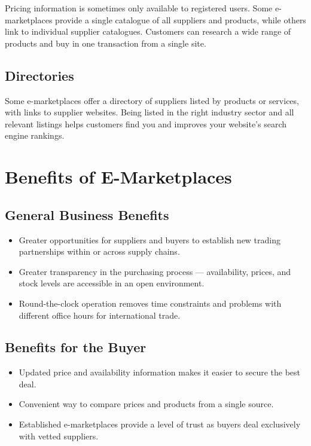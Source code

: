 \documentclass[12pt,a4paper]{article}
\begin{document}
Pricing information is sometimes only available to registered users. Some e-marketplaces provide a single catalogue of all suppliers and products, while others link to individual supplier catalogues. Customers can research a wide range of products and buy in one transaction from a single site.

\subsection{Directories}
Some e-marketplaces offer a directory of suppliers listed by products or services, with links to supplier websites. Being listed in the right industry sector and all relevant listings helps customers find you and improves your website's search engine rankings.

\section{Benefits of E-Marketplaces}

\subsection{General Business Benefits}
\begin{itemize}
    \item Greater opportunities for suppliers and buyers to establish new trading partnerships within or across supply chains.
    \item Greater transparency in the purchasing process --- availability, prices, and stock levels are accessible in an open environment.
    \item Round-the-clock operation removes time constraints and problems with different office hours for international trade.
\end{itemize}

\subsection{Benefits for the Buyer}
\begin{itemize}
    \item Updated price and availability information makes it easier to secure the best deal.
    \item Convenient way to compare prices and products from a single source.
    \item Established e-marketplaces provide a level of trust as buyers deal exclusively with vetted suppliers.
\end{itemize}
\end{document}
